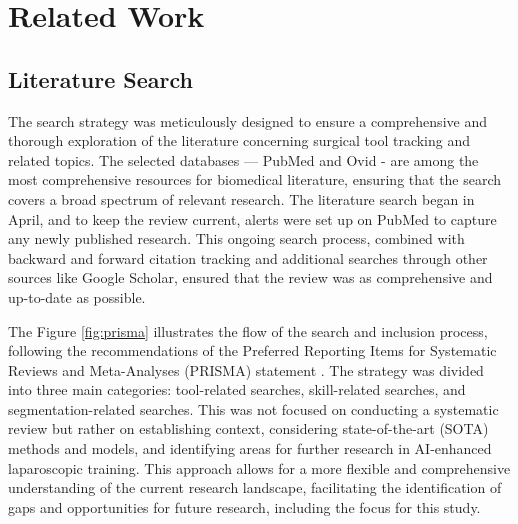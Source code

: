 \section{Related Work}

\subsection{Literature Search}

The search strategy was meticulously designed to ensure a comprehensive and thorough exploration of the literature concerning surgical tool tracking and related topics. The selected databases — PubMed and Ovid - are among the most comprehensive resources for biomedical literature, ensuring that the search covers a broad spectrum of relevant research. The literature search began in April, and to keep the review current, alerts were set up on PubMed to capture any newly published research. This ongoing search process, combined with backward and forward citation tracking and additional searches through other sources like Google Scholar, ensured that the review was as comprehensive and up-to-date as possible.

The Figure \ref{fig:prisma} illustrates the flow of the search and inclusion process, following the recommendations of the Preferred Reporting Items for Systematic Reviews and Meta-Analyses (PRISMA) statement \cite{moher_preferred_2010}. The strategy was divided into three main categories: tool-related searches, skill-related searches, and segmentation-related searches. This was not focused on conducting a systematic review but rather on establishing context, considering state-of-the-art (SOTA) methods and models, and identifying areas for further research in AI-enhanced laparoscopic training. This approach allows for a more flexible and comprehensive understanding of the current research landscape, facilitating the identification of gaps and opportunities for future research, including the focus for this study.

